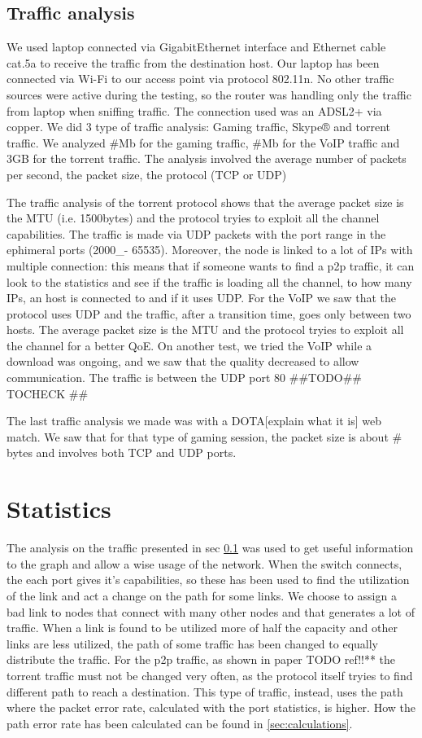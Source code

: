 \documentclass[conference,10pt]{IEEEtran}
\begin{document}
\subsection{Traffic analysis}\label{sec:traf}
We used laptop connected via
GigabitEthernet interface and Ethernet cable cat.5a to receive the traffic from the destination host.
Our laptop has been connected via Wi-Fi to our access point via protocol 802.11n.
No other traffic sources were active during the testing, so the router was handling only
the traffic from laptop when sniffing traffic. The connection used was an ADSL2+ via copper.
We did 3 type of traffic analysis: Gaming traffic, Skype® and torrent traffic. We analyzed
#Mb for the gaming traffic, #Mb for the VoIP traffic and 3GB for the torrent traffic.
The analysis involved the average number of packets per second, the packet size, the protocol (TCP or UDP)

The traffic analysis of the torrent protocol shows that the average packet size is the MTU
(i.e. 1500bytes) and the protocol tryies to exploit all the channel capabilities. The traffic
is made via UDP packets with the port range in the ephimeral ports (2000_- 65535).
Moreover, the node is linked to a lot of IPs with multiple connection: this means that
if someone wants to find a p2p traffic, it can look to the statistics and see if the traffic is loading all the channel,
to how many IPs, an host is connected to and if it uses UDP.
For the VoIP we saw that the protocol uses UDP and the traffic, after a transition time, goes only between two hosts.
The average packet size is the MTU and the protocol tryies to exploit all the channel for a better QoE.
On another test, we tried the VoIP while a download was ongoing, and we saw that the quality
decreased to allow communication. The traffic is between the UDP port 80 ##TODO## TOCHECK ##

The last traffic analysis we made was with a DOTA[explain what it is] web match.
We saw that for that type of gaming session, the packet size is about # bytes and involves both TCP and UDP ports.

\section{Statistics}
The analysis on the traffic presented in sec \ref{sec:traf} was used to get useful information to the graph and allow
a wise usage of the network. When the switch connects, the each port gives it's capabilities, so these has been used to
find the utilization of the link and act a change on the path for some links. We choose to assign a bad link
to nodes that connect with many other nodes and that generates a lot of traffic. When a link is found to be utilized more of half the
capacity and other links are less utilized, the path of some traffic has been changed to equally distribute the traffic.
For the p2p traffic, as shown in paper TODO ref!!** the torrent traffic must not be changed very often, as
the protocol itself tryies to find different path to reach a destination. This type of traffic, instead, uses the path
where the packet error rate, calculated with the port statistics, is higher. How the path error rate has been calculated
can be found in \ref{sec:calculations}.
\end{document}
